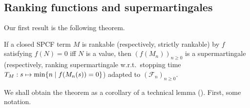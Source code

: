 \subsection{Ranking functions and supermartingales}


Our first result is the following theorem.
\begin{theorem}[Rankability] 
\label{thm:rankable and strict rankable}
If a closed SPCF term $M$ is rankable (respectively, strictly rankable) by $f$ satisfying $f(N) = 0$ iff $N$ is a value, then $(f(M_n))_{n \geq 0}$ is a supermartingale (respectively, ranking supermartingale w.r.t.~stopping time $T_M: s \mapsto \min \{n \mid f(M_n(s)) = 0\}$) adapted to $(\mathcal{F}_n)_{n \geq 0}$. %
\end{theorem}


We shall obtain the theorem as a corollary of a technical lemma ().
First, some notation.

